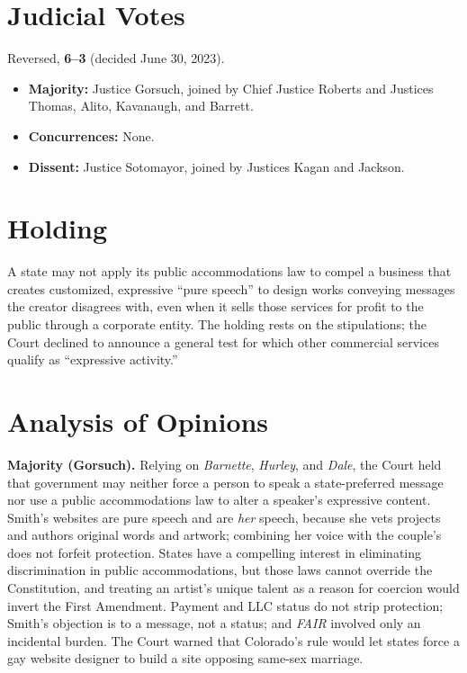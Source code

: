 \documentclass[12pt]{article}
\begin{document}
\section{Judicial Votes}

Reversed, \textbf{6--3} (decided June 30, 2023).
\begin{itemize}
\item \textbf{Majority:} Justice Gorsuch, joined by Chief Justice Roberts and Justices Thomas, Alito, Kavanaugh, and Barrett.
\item \textbf{Concurrences:} None.
\item \textbf{Dissent:} Justice Sotomayor, joined by Justices Kagan and Jackson.
\end{itemize}

\section{Holding}

A state may not apply its public accommodations law to compel a business that creates customized, expressive ``pure speech'' to design works conveying messages the creator disagrees with, even when it sells those services for profit to the public through a corporate entity. The holding rests on the stipulations; the Court declined to announce a general test for which other commercial services qualify as ``expressive activity.''

\section{Analysis of Opinions}

\textbf{Majority (Gorsuch).} Relying on \textit{Barnette}, \textit{Hurley}, and \textit{Dale}, the Court held that government may neither force a person to speak a state-preferred message nor use a public accommodations law to alter a speaker's expressive content. Smith's websites are pure speech and are \emph{her} speech, because she vets projects and authors original words and artwork; combining her voice with the couple's does not forfeit protection. States have a compelling interest in eliminating discrimination in public accommodations, but those laws cannot override the Constitution, and treating an artist's unique talent as a reason for coercion would invert the First Amendment. Payment and LLC status do not strip protection; Smith's objection is to a message, not a status; and \textit{FAIR} involved only an incidental burden. The Court warned that Colorado's rule would let states force a gay website designer to build a site opposing same-sex marriage.
\end{document}
